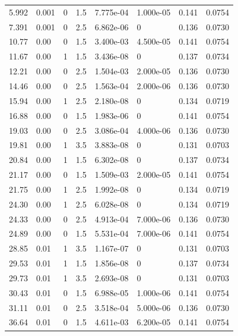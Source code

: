 \documentclass[preview]{standalone}
\begin{document}
{{\begin{tabular}{L{1.2cm}C{1.2cm} C{0.3cm}C{0.5cm} C{1.4cm}C{1.4cm} C{1.4cm}C{1.4cm}}
  5.992  &  0.001  & 0     & 1.5 &  7.775e-04  & 1.000e-05  & 0.141 &  0.0754   \\ 
  7.391  &  0.001  & 0     & 2.5 &  6.862e-06  & 0  & 0.136 &  0.0730   \\ 
  10.77  &  0.00  & 0     & 1.5 &  3.400e-03  & 4.500e-05  & 0.141 &  0.0754   \\ 
  11.67  &  0.00  & 1     & 1.5 &  3.436e-08  & 0  & 0.137 &  0.0734   \\ 
  12.21  &  0.00  & 0     & 2.5 &  1.504e-03  & 2.000e-05  & 0.136 &  0.0730   \\ 
  14.46  &  0.00  & 0     & 2.5 &  1.563e-04  & 2.000e-06  & 0.136 &  0.0730   \\ 
  15.94  &  0.00  & 1     & 2.5 &  2.180e-08  & 0  & 0.134 &  0.0719   \\ 
  16.88  &  0.00  & 0     & 1.5 &  1.983e-06  & 0  & 0.141 &  0.0754   \\ 
  19.03  &  0.00  & 0     & 2.5 &  3.086e-04  & 4.000e-06  & 0.136 &  0.0730   \\ 
  19.81  &  0.00  & 1     & 3.5 &  3.883e-08  & 0  & 0.131 &  0.0703   \\ 
  20.84  &  0.00  & 1     & 1.5 &  6.302e-08  & 0  & 0.137 &  0.0734   \\ 
  21.17  &  0.00  & 0     & 1.5 &  1.509e-03  & 2.000e-05  & 0.141 &  0.0754   \\ 
  21.75  &  0.00  & 1     & 2.5 &  1.992e-08  & 0  & 0.134 &  0.0719   \\ 
  24.30  &  0.00  & 1     & 2.5 &  6.028e-08  & 0  & 0.134 &  0.0719   \\ 
  24.33  &  0.00  & 0     & 2.5 &  4.913e-04  & 7.000e-06  & 0.136 &  0.0730   \\ 
  24.89  &  0.00  & 0     & 1.5 &  5.531e-04  & 7.000e-06  & 0.141 &  0.0754   \\ 
  28.85  &  0.01  & 1     & 3.5 &  1.167e-07  & 0  & 0.131 &  0.0703   \\ 
  29.53  &  0.01  & 1     & 1.5 &  1.856e-08  & 0  & 0.137 &  0.0734   \\ 
  29.73  &  0.01  & 1     & 3.5 &  2.693e-08  & 0  & 0.131 &  0.0703   \\ 
  30.43  &  0.01  & 0     & 1.5 &  6.988e-05  & 1.000e-06  & 0.141 &  0.0754   \\ 
  31.11  &  0.01  & 0     & 2.5 &  3.518e-04  & 5.000e-06  & 0.136 &  0.0730   \\ 
  36.64  &  0.01  & 0     & 1.5 &  4.611e-03  & 6.200e-05  & 0.141 &  0.0754   \\ 

\end{tabular}}}
\end{document}

